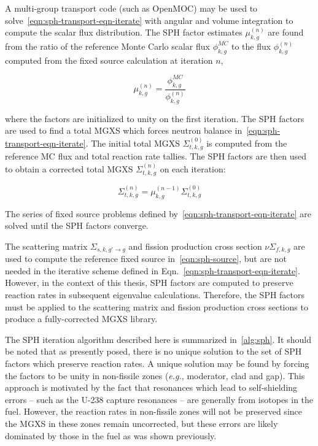\noindent A multi-group transport code (such as OpenMOC) may be used to solve~\autoref{eqn:sph-transport-eqn-iterate} with angular and volume integration to compute the scalar flux distribution. The SPH factor estimates $\mu_{k,g}^{(n)}$ are found from the ratio of the reference Monte Carlo scalar flux $\phi_{k,g}^{MC}$ to the flux $\phi_{k,g}^{(n)}$ computed from the fixed source calculation at iteration $n$,

\begin{equation}
\label{eqn:sph-update}
\mu_{k,g}^{(n)} = \frac{\phi_{k,g}^{MC}}{\phi_{k,g}^{(n)}}
\end{equation}

\noindent where the factors are initialized to unity on the first iteration. The SPH factors are used to find a total MGXS which forces neutron balance in~\autoref{eqn:sph-transport-eqn-iterate}. The initial total MGXS $\Sigma_{t,k,g}^{(0)}$ is computed from the reference MC flux and total reaction rate tallies. The SPH factors are then used to obtain a corrected total MGXS $\Sigma_{t,k,g}^{(n)}$ on each iteration:

\begin{dmath}
\label{eqn:sph-update-sigt}
\Sigma_{t,k,g}^{(n)} = \mu_{k,g}^{(n-1)}\Sigma_{t,k,g}^{(0)}
\end{dmath}

The series of fixed source problems defined by~\autoref{eqn:sph-transport-eqn-iterate} are solved until the SPH factors converge.

The scattering matrix $\Sigma_{s,k,g'\rightarrow g}$ and fission production cross section $\nu\Sigma_{f,k,g}$ are used to compute the reference fixed source in~\autoref{eqn:sph-source}, but are not needed in the iterative scheme defined in Eqn.~\ref{eqn:sph-transport-eqn-iterate}. However, in the context of this thesis, SPH factors are computed to preserve reaction rates in subsequent eigenvalue calculations. Therefore, the SPH factors must be applied to the scattering matrix and fission production cross sections to produce a fully-corrected MGXS library.

The SPH iteration algorithm described here is summarized in~\autoref{alg:sph}. It should be noted that as presently posed, there is no unique solution to the set of SPH factors which preserve reaction rates. A unique solution may be found by forcing the factors to be unity in non-fissile zones (\textit{e.g.}, moderator, clad and gap). This approach is motivated by the fact that resonances which lead to self-shielding errors -- such as the U-238 capture resonances -- are generally from isotopes in the fuel. However, the reaction rates in non-fissile zones will not be preserved since the MGXS in these zones remain uncorrected, but these errors are likely dominated by those in the fuel as was shown previously.


